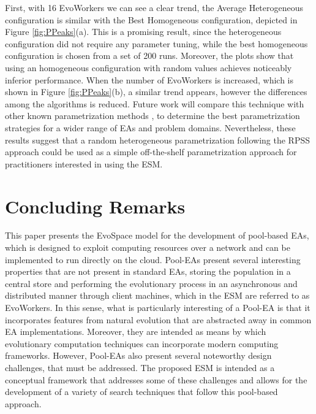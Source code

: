 First, with 16 EvoWorkers we can see a clear trend, the Average Heterogeneous configuration is similar with the Best Homogeneous configuration,
depicted in Figure \ref{fig:PPeaks}(a).
This is a promising result, since the heterogeneous configuration did not require any parameter tuning, while the best homogeneous configuration
is chosen from a set of 200 runs.
Moreover, the plots show that using an homogeneous configuration with random values achieves noticeably inferior performance.
When the number of EvoWorkers is increased, which is shown in Figure \ref{fig:PPeaks}(b), a similar trend appears,
however the differences among the algorithms is reduced.
Future work will compare this technique with other known parametrization methods \cite{cantu}, to determine the best
parametrization strategies for a wider range of EAs and problem domains. 
Nevertheless, these results suggest that a random heterogeneous parametrization following the RPSS approach could be used as a simple off-the-shelf
parametrization approach for practitioners interested in using the ESM.



\section{Concluding Remarks}
\label{sec:conclusions}
This paper presents the EvoSpace model for the development of pool-based EAs, which is designed to exploit computing resources over a network and can be implemented to run directly on the cloud.
Pool-EAs present several interesting properties that are not present in standard EAs, storing the population in a central store and
performing the evolutionary process in an asynchronous and distributed manner through client machines,
which in the ESM are referred to as EvoWorkers.
In this sense, what is particularly interesting of a Pool-EA is that it incorporates features from natural evolution that are abstracted away in common EA implementations.
Moreover, they are intended as means by which evolutionary computation techniques can incorporate modern computing frameworks.
However, Pool-EAs also present several noteworthy design challenges, that must be addressed.
The proposed ESM is intended as a conceptual framework that addresses some of these challenges and allows for the development of a variety of search techniques
that follow this pool-based approach.

